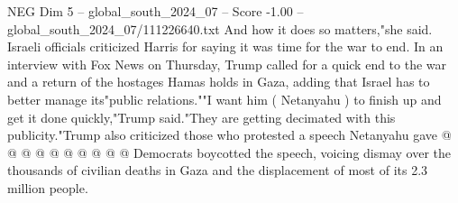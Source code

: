 \begin{textsample}{NEG Dim 5 – global\_south\_2024\_07 – Score -1.00 – global\_south\_2024\_07/111226640.txt}
And how it does so matters,"she said.
Israeli officials criticized Harris for saying it was time for the war to end.
In an interview with Fox News on Thursday, Trump called for a quick end to the war and a return of the hostages Hamas holds in Gaza, adding that Israel has to better manage its"public relations.""I want him ( Netanyahu ) to finish up and get it done quickly,"Trump said."They are getting decimated with this publicity."Trump also criticized those who protested a speech Netanyahu gave @ @ @ @ @ @ @ @ @ @ Democrats boycotted the speech, voicing dismay over the thousands of civilian deaths in Gaza and the displacement of most of its 2.3 million people.

\end{textsample}
